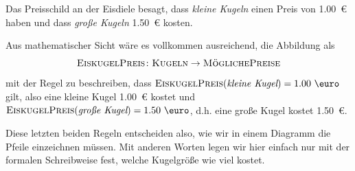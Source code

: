 \documentclass[../../main.tex]{subfiles}
\begin{document}
\begin{example}{}
    Das Preisschild an der Eisdiele besagt, dass \emph{kleine Kugeln} einen Preis von 1.00~\euro{} haben und dass \emph{große Kugeln} 1.50~\euro{} kosten. 
    
    Aus mathematischer Sicht wäre es vollkommen ausreichend, die Abbildung als \[\textsc{EiskugelPreis}\colon\textsc{Kugeln}\rightarrow\textsc{MöglichePreise}\] 
    mit der Regel zu beschreiben, dass $\textsc{EiskugelPreis}(\textit{kleine Kugel})=\text{1.00 \euro}$ gilt, also eine kleine Kugel 1.00~\euro{} kostet und $\textsc{EiskugelPreis}(\textit{große Kugel})=\text{1.50 \euro}$, d.h. eine große Kugel kostet 1.50~\euro. 
    
    Diese letzten beiden Regeln entscheiden also, wie wir in einem Diagramm die Pfeile einzeichnen müssen. Mit anderen Worten legen wir hier einfach nur mit der formalen Schreibweise fest, welche Kugelgröße wie viel kostet.
\end{example}
\end{document}
